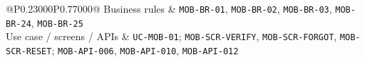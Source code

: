 \begin{longtable}{@{}P{0.23000\SRSWidth}P{0.77000\SRSWidth}@{}}
Business rules & \texttt{MOB-\allowbreak{}BR-\allowbreak{}01}, \texttt{MOB-\allowbreak{}BR-\allowbreak{}02}, \texttt{MOB-\allowbreak{}BR-\allowbreak{}03}, \texttt{MOB-\allowbreak{}BR-\allowbreak{}24}, \texttt{MOB-\allowbreak{}BR-\allowbreak{}25} \\[3pt]
Use case /\allowbreak{} screens /\allowbreak{} APIs & \texttt{UC-\allowbreak{}MOB-\allowbreak{}01}; \texttt{MOB-\allowbreak{}SCR-\allowbreak{}VERIFY}, \texttt{MOB-\allowbreak{}SCR-\allowbreak{}FORGOT}, \texttt{MOB-\allowbreak{}SCR-\allowbreak{}RESET}; \texttt{MOB-\allowbreak{}API-\allowbreak{}006}, \texttt{MOB-\allowbreak{}API-\allowbreak{}010}, \texttt{MOB-\allowbreak{}API-\allowbreak{}012} \\[3pt]
\end{longtable}
\endgroup


